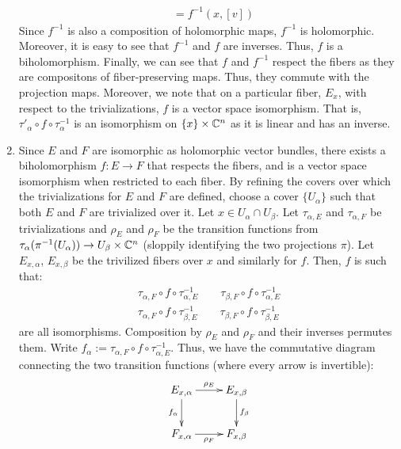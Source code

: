 \documentclass[12pt]{article}
\begin{document}
\begin{solution}
\begin{enumerate}
\begin{align*}
            &= f^{-1}(x, [v])
        \end{align*}
        Since $f^{-1}$ is also a composition of holomorphic maps, $f^{-1}$ is holomorphic. Moreover, it is easy to see that $f^{-1}$ and $f$ are inverses. Thus, $f$ is a biholomorphism. \bbni
        Finally, we can see that $f$ and $f^{-1}$ respect the fibers as they are compositons of fiber-preserving maps. Thus, they commute with the projection maps. Moreover, we note that on a particular fiber, $E_x$, with respect to the trivializations, $f$ is a vector space isomorphism. That is, $\tau'_{\alpha} \circ f \circ \tau^{-1}_{\alpha}$ is an isomorphism on $\{x\} \times \mathbb C^n$ as it is linear and has an inverse.
        \item Since $E$ and $F$ are isomorphic as holomorphic vector bundles, there exists a biholomorphism $f: E \to F$ that respects the fibers, and is a vector space isomorphism when restricted to each fiber. \bbni
        By refining the covers over which the trivializations for $E$ and $F$ are defined, choose a cover $\{U_\alpha\}$ such that both $E$ and $F$ are trivialized over it. Let $x \in U_\alpha \cap U_\beta$. Let $\tau_{\alpha, E}$ and $\tau_{\alpha, F}$ be trivializations and $\rho_E$ and $\rho_F$ be the transition functions from $\tau_\alpha(\pi^{-1}(U_\alpha)) \to U_\beta \times \mathbb C^n$ (sloppily identifying the two projections $\pi$). Let $E_{x, \alpha}$, $E_{x, \beta}$ be the trivilized fibers over $x$ and similarly for $f$. Then, $f$ is such that:
        \begin{align*}
            \tau_{\alpha, F} \circ f \circ \tau_{\alpha, E}^{-1} \qquad \tau_{\beta, F} \circ f \circ \tau_{\alpha, E}^{-1}  \\
            \tau_{\alpha, F} \circ f \circ \tau_{\beta, E}^{-1} \qquad \tau_{\beta, F} \circ f \circ \tau_{\beta, E}^{-1}
        \end{align*} 
        are all isomorphisms. Composition by $\rho_E$ and $\rho_F$ and their inverses permutes them. Write $f_{\alpha} := \tau_{\alpha, F} \circ f \circ \tau_{\alpha, E}^{-1}$. Thus, we have the commutative diagram connecting the two transition functions (where every arrow is invertible):
        \[
            \xymatrix{ E_{x, \alpha} \ar[r]^{\rho_E} \ar[d]_{f_\alpha} & E_{x, \beta} \ar[d]^{f_\beta} \\
            F_{x, \alpha} \ar[r]_{\rho_F} & F_{x, \beta}}
        \]

\end{enumerate}
\end{solution}
\end{document}
